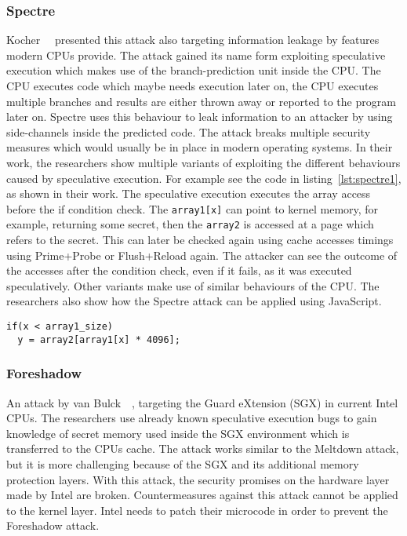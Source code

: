\subsubsection{Spectre}

Kocher~\etal~\cite{spectre} presented this attack also targeting information
leakage by features modern CPUs provide. The attack gained its name form
exploiting speculative execution which makes use of the branch-prediction unit
inside the CPU. The CPU executes code which maybe needs execution later on,
the CPU executes multiple branches and results are either thrown away or
reported to the program later on. Spectre uses this behaviour to leak
information to an attacker by using side-channels inside the predicted code.
The attack breaks multiple security measures which would usually be in place in
modern operating systems. In their work, the researchers show multiple variants
of exploiting the different behaviours caused by speculative execution. For
example see the code in listing~\ref{lst:spectre1}, as shown in their work. The
speculative execution executes the array access before the if condition check.
The \texttt{array1[x]} can point to kernel memory, for example, returning some
secret, then the \texttt{array2} is accessed at a page which refers to the
secret. This can later be checked again using cache accesses timings using
Prime+Probe or Flush+Reload again. The attacker can see the outcome of the
accesses after the condition check, even if it fails, as it was executed
speculatively. Other variants make use of similar behaviours of the CPU. The
researchers also show how the Spectre attack can be applied using JavaScript.

\begin{minipage}{\linewidth}
\begin{lstlisting}[style=CStyle,
                   caption={Code for Spectre variant one, showing a
conditional branch example, as seen by the work done by
Kocher~\etal~\cite{spectre}.},
                   label={lst:spectre1}]
if(x < array1_size)
  y = array2[array1[x] * 4096];
\end{lstlisting}
\end{minipage}

\subsubsection{Foreshadow}

An attack by van Bulck~\etal~\cite{foreshadow}, targeting the Guard eXtension
(SGX) in current Intel CPUs. The researchers use already known speculative
execution bugs to gain knowledge of secret memory used inside the SGX
environment which is transferred to the CPU\textquotesingle s cache. The attack
works similar to the Meltdown attack, but it is more challenging because of the
SGX and its additional memory protection layers. With this attack, the security
promises on the hardware layer made by Intel are broken. Countermeasures
against this attack cannot be applied to the kernel layer. Intel needs to patch
their microcode in order to prevent the Foreshadow attack.

